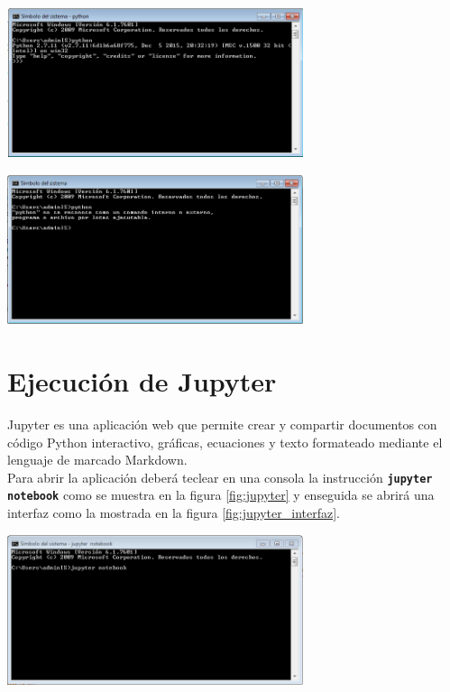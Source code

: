 \documentclass[12pt,letterpaper]{article}
\begin{document}
\begin{center}
\includegraphics[width=0.65\textwidth]{img/consola_ok.PNG}
\label{fig:consola_ok}
\end{center}

\begin{center}
\includegraphics[width=0.65\textwidth]{img/consola_no_ok.PNG}
\label{fig:consola_no_ok}
\end{center}


\section{Ejecución de Jupyter}

Jupyter es una aplicación web que permite crear y compartir documentos con código Python interactivo, gráficas, ecuaciones y 
texto formateado mediante el lenguaje de marcado Markdown.\\

Para abrir la aplicación deberá teclear en una consola la instrucción {\bf\tt jupyter notebook} como se muestra en 
la figura \ref{fig:jupyter} y enseguida se abrirá una interfaz como la mostrada en la figura \ref{fig:jupyter_interfaz}.

\begin{center}
\includegraphics[width=0.65\textwidth]{img/jupyter.PNG}
\label{fig:jupyter}
\end{center}
\end{document}
